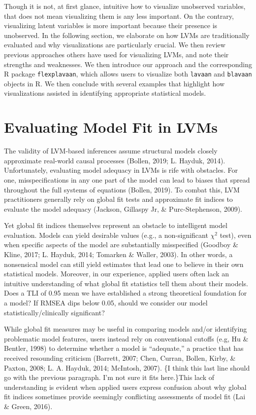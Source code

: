 \documentclass[
  english,
  doc]{apa6}
\begin{document}
Though it is not, at first glance, intuitive how to visualize unobserved variables, that does not mean visualizing them is any less important. On the contrary, visualizing latent variables is more important because their presence is unobserved. In the following section, we elaborate on how LVMs are traditionally evaluated and why visualizations are particularly crucial. We then review previous approaches others have used for visualizing LVMs, and note their strengths and weaknesses. We then introduce our approach and the corresponding R package \texttt{flexplavaan}, which allows users to visualize both \texttt{lavaan} and \texttt{blavaan} objects in R. We then conclude with several examples that highlight how visualizations assisted in identifying appropriate statistical models.

\hypertarget{evaluating-model-fit-in-lvms}{%
\section{Evaluating Model Fit in LVMs}\label{evaluating-model-fit-in-lvms}}

The validity of LVM-based inferences assume structural models closely approximate real-world causal processes (Bollen, 2019; L. Hayduk, 2014). Unfortunately, evaluating model adequacy in LVMs is rife with obstacles. For one, misspecifications in any one part of the model can lead to biases that spread throughout the full systems of equations (Bollen, 2019). To combat this, LVM practitioners generally rely on global fit tests and approximate fit indices to evaluate the model adequacy (Jackson, Gillaspy Jr, \& Purc-Stephenson, 2009).

Yet global fit indices themselves represent an obstacle to intelligent model evaluation. Models can yield desirable values (e.g., a non-significant \(\chi^2\) test), even when specific aspects of the model are substantially misspecified (Goodboy \& Kline, 2017; L. Hayduk, 2014; Tomarken \& Waller, 2003). In other words, a nonsensical model can still yield estimates that lead one to believe in their own statistical models. Moreover, in our experience, applied users often lack an intuitive understanding of what global fit statistics tell them about their models. Does a TLI of 0.95 mean we have established a strong theoretical foundation for a model? If RMSEA dips below 0.05, should we consider our model statistically/clinically significant?

While global fit measures may be useful in comparing models and/or identifying problematic model features, users instead rely on conventional cutoffs (e.g, Hu \& Bentler, 1998) to determine whether a model is ``adequate,'' a practice that has received resounding criticism (Barrett, 2007; Chen, Curran, Bollen, Kirby, \& Paxton, 2008; L. A. Hayduk, 2014; McIntosh, 2007). \{I think this last line should go with the previous paragraph. I'm not sure it fits here.\}This lack of understanding is evident when applied users express confusion about why global fit indices sometimes provide seemingly conflicting assessments of model fit (Lai \& Green, 2016).
\end{document}
